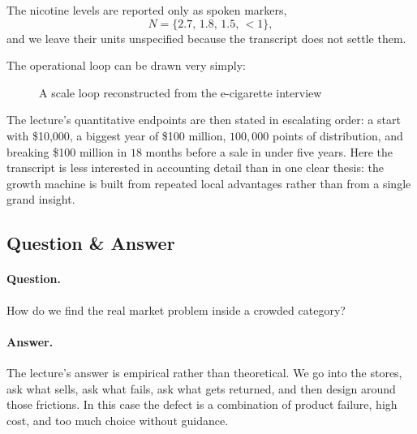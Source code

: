 The nicotine levels are reported only as spoken markers,
\[
N=\{2.7,\,1.8,\,1.5,\,<1\},
\]
and we leave their units unspecified because the transcript does not settle them.

The operational loop can be drawn very simply:
\begin{figure}[h]
\centering
{}
\caption{A scale loop reconstructed from the e-cigarette interview}
\end{figure}

The lecture's quantitative endpoints are then stated in escalating order: a start with \$10{,}000, a biggest year of \$100 million, \(100{,}000\) points of distribution, and breaking \$100 million in \(18\) months before a sale in under five years. Here the transcript is less interested in accounting detail than in one clear thesis: the growth machine is built from repeated local advantages rather than from a single grand insight.

\subsection{Question \& Answer}

\paragraph{Question.} How do we find the real market problem inside a crowded category?

\paragraph{Answer.} The lecture's answer is empirical rather than theoretical. We go into the stores, ask what sells, ask what fails, ask what gets returned, and then design around those frictions. In this case the defect is a combination of product failure, high cost, and too much choice without guidance.

